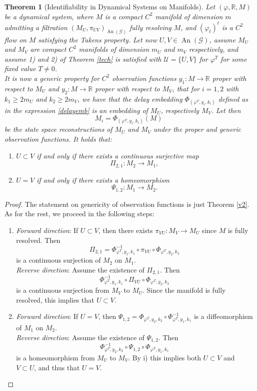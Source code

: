 \documentclass[11pt, a4paper]{memoir}
\theoremstyle{break}
\newtheorem{thm}{Theorem}
\theoremstyle{break}
\theoremstyle{nonumberplain}
\newtheorem{proof}{Proof}
\newcommand{\mR}{\mathbb{R}}
\DeclareMathOperator{\an}{An}
\begin{document}
\begin{thm}[Identifiability in Dynamical Systems on Manifolds]\label{id1}
Let $(\varphi,\mR,M)$ be a dynamical system, where $M$ is a compact $C^2$ manifold of dimension $m$ admitting a filtration $(M_U,\pi_{UV})_{\an(\mathcal{G})}$ fully resolving $M$, and $(\varphi_t)^t$ is a $C^2$ flow on $M$ satisfying the Takens property. Let now $U,V\in \an(\mathcal{G})$, assume $M_U$ and $M_V$ are compact $C^2$ manifolds of dimension $m_U$ and $m_V$ respectively, and assume 1) and 2) of Theorem \ref{tech} is satisfied with $\mathcal{U}=\{U,V\}$ for $\varphi^T$ for some fixed value $T\neq 0$.\\[5pt]
It is now a generic property for $C^2$ observation functions $y_1:M\to \mR$ proper with respect to $M_U$ and $y_2:M\to\mR$ proper with respect to $M_V$, that for $i=1,2$ with $k_1\geqslant 2m_U$ and $k_2\geqslant 2m_V$, we have that the delay embedding $\Phi_{(\varphi^T,y_i,k_i)}$ defined as in the expression \ref{delayemb} is an embedding of $M_U$, respectively $M_V$. Let then $$M_i=\Phi_{(\varphi^T,y_i,k_i)}(M)$$ 
be the state space reconstructions of $M_U$ and $M_V$ under the proper and generic observation functions. It holds that:
\begin{enumerate}[label=\roman*.]
	\item $U\subset V$ if and only if there exists a continuous surjective map
	$$\Pi_{2,1}:M_2\to M_1,$$ 
	\item $U=V$ if and only if there exists a homeomorphism
	$$\Psi_{1,2}:M_1\to M_2.$$
\end{enumerate}
\end{thm}
\begin{proof}
The statement on genericity of observation functions is just Theorem \ref{v2}. As for the rest, we proceed in the following steps:
\begin{enumerate}[label=\roman*.]
	\item \textit{Forward direction}: If $U\subset V$, then there exists $\pi_{VU}:M_V\to M_U$ since $M$ is fully resolved. Then
	$$\Pi_{2,1}=\Phi_{\varphi^T,y_1,k_1}^{-1}\circ\pi_{VU}\circ \Phi_{\varphi^T,y_2,k_2} $$ is a continuous surjection of $M_2$ on $M_1$.\\[5pt]
	\textit{Reverse direction}: Assume the existence of $\Pi_{2,1}$. Then
	$$\Phi_{\varphi^T,y_1,k_1}^{-1} \circ\Pi_{VU}\circ  \Phi_{\varphi^T,y_2,k_2} $$
	is a continuous surjection from $M_V$ to $M_U$. Since the manifold is fully resolved, this implies that $U\subset V$.
	\item \textit{Forward direction}: If $U=V$, then $\Psi_{1,2}=\Phi_{\varphi^T,y_2,k_2}\circ \Phi_{\varphi^T,y_1,k_1}^{-1}$ is a diffeomorphism of $M_1$ on $M_2$.\\[5pt]
	\textit{Reverse direction}: Assume the existence of $\Psi_{1,2}$. Then
	$$\Phi_{\varphi^T,y_2,k_2}^{-1}\circ \Psi_{1,2} \circ \Phi_{\varphi^T,y_1,k_1}$$
	is a homeomorphism from $M_U$ to $M_V$. By i) this implies both $U\subset V$ and $V\subset U$, and thus that $U=V$.
\end{enumerate}
\end{proof}
\end{document}
